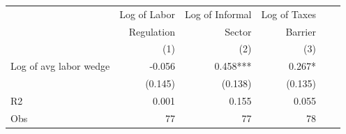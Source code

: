  \begin{tabular}{lrrrrr}\hline
& Log of Labor  & Log of Informal & Log of Taxes   \\
& Regulation    & Sector          & Barrier        \\
& (1)           & (2)             & (3)            \\ \hline
Log of avg labor wedge&-0.056&0.458***&0.267*\\
&(0.145)&(0.138)&(0.135)\\
R2&0.001&0.155&0.055\\
Obs&77&77&78\\
\hline \end{tabular}
